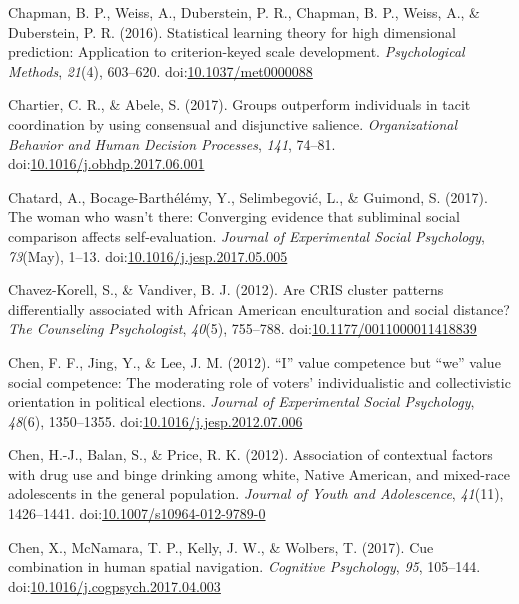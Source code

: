 \documentclass[english,man]{apa6}
\theoremstyle{definition}
\theoremstyle{definition}
\theoremstyle{definition}
\theoremstyle{remark}
\begin{document}
\hypertarget{ref-Chapman2016}{}
Chapman, B. P., Weiss, A., Duberstein, P. R., Chapman, B. P., Weiss, A.,
\& Duberstein, P. R. (2016). Statistical learning theory for high
dimensional prediction: Application to criterion-keyed scale
development. \emph{Psychological Methods}, \emph{21}(4), 603--620.
doi:\href{https://doi.org/10.1037/met0000088}{10.1037/met0000088}

\hypertarget{ref-Chartier2017}{}
Chartier, C. R., \& Abele, S. (2017). Groups outperform individuals in
tacit coordination by using consensual and disjunctive salience.
\emph{Organizational Behavior and Human Decision Processes}, \emph{141},
74--81.
doi:\href{https://doi.org/10.1016/j.obhdp.2017.06.001}{10.1016/j.obhdp.2017.06.001}

\hypertarget{ref-Chatard2017}{}
Chatard, A., Bocage-Barthélémy, Y., Selimbegović, L., \& Guimond, S.
(2017). The woman who wasn't there: Converging evidence that subliminal
social comparison affects self-evaluation. \emph{Journal of Experimental
Social Psychology}, \emph{73}(May), 1--13.
doi:\href{https://doi.org/10.1016/j.jesp.2017.05.005}{10.1016/j.jesp.2017.05.005}

\hypertarget{ref-Chavez-Korell2012}{}
Chavez-Korell, S., \& Vandiver, B. J. (2012). Are CRIS cluster patterns
differentially associated with African American enculturation and social
distance? \emph{The Counseling Psychologist}, \emph{40}(5), 755--788.
doi:\href{https://doi.org/10.1177/0011000011418839}{10.1177/0011000011418839}

\hypertarget{ref-Chen2012a}{}
Chen, F. F., Jing, Y., \& Lee, J. M. (2012). ``I'' value competence but
``we'' value social competence: The moderating role of voters'
individualistic and collectivistic orientation in political elections.
\emph{Journal of Experimental Social Psychology}, \emph{48}(6),
1350--1355.
doi:\href{https://doi.org/10.1016/j.jesp.2012.07.006}{10.1016/j.jesp.2012.07.006}

\hypertarget{ref-Chen2012}{}
Chen, H.-J., Balan, S., \& Price, R. K. (2012). Association of
contextual factors with drug use and binge drinking among white, Native
American, and mixed-race adolescents in the general population.
\emph{Journal of Youth and Adolescence}, \emph{41}(11), 1426--1441.
doi:\href{https://doi.org/10.1007/s10964-012-9789-0}{10.1007/s10964-012-9789-0}

\hypertarget{ref-Chen2017}{}
Chen, X., McNamara, T. P., Kelly, J. W., \& Wolbers, T. (2017). Cue
combination in human spatial navigation. \emph{Cognitive Psychology},
\emph{95}, 105--144.
doi:\href{https://doi.org/10.1016/j.cogpsych.2017.04.003}{10.1016/j.cogpsych.2017.04.003}
\end{document}
